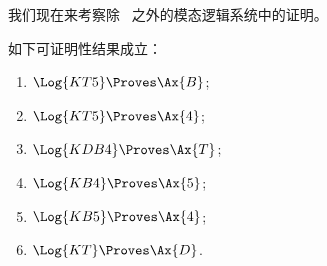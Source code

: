 \documentclass[../../../include/open-logic-section]{subfiles}
\begin{document}


我们现在来考察除~ 之外的模态逻辑系统中的证明。

\begin{prop}
如下可证明性结果成立：
  \begin{enumerate}
  \item $\Log{KT5} \Proves \Ax{B}$;
  \item $\Log{KT5} \Proves \Ax{4}$;
  \item $\Log{KDB4} \Proves \Ax{T}$;
  \item $\Log{KB4} \Proves \Ax{5}$;
  \item $\Log{KB5} \Proves \Ax{4}$;
  \item {}$\Log{KT} \Proves \Ax{D}$.
  \end{enumerate}
\end{prop}
\end{document}
